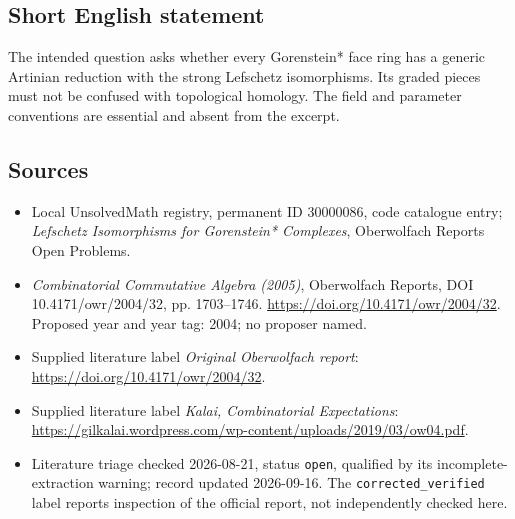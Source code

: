 \documentclass[11pt]{article}
\begin{document}
\subsection{Short English statement}
The intended question asks whether every Gorenstein* face ring has a generic Artinian reduction with the strong Lefschetz isomorphisms. Its graded pieces must not be confused with topological homology. The field and parameter conventions are essential and absent from the excerpt.
\subsection{Sources}
\begin{itemize}\item Local UnsolvedMath registry, permanent ID 30000086, code catalogue entry; \emph{Lefschetz Isomorphisms for Gorenstein* Complexes}, Oberwolfach Reports Open Problems.\item \emph{Combinatorial Commutative Algebra (2005)}, Oberwolfach Reports, DOI 10.4171/owr/2004/32, pp. 1703--1746. \url{https://doi.org/10.4171/owr/2004/32}. Proposed year and year tag: 2004; no proposer named.\item Supplied literature label \emph{Original Oberwolfach report}: \url{https://doi.org/10.4171/owr/2004/32}.\item Supplied literature label \emph{Kalai, Combinatorial Expectations}: \url{https://gilkalai.wordpress.com/wp-content/uploads/2019/03/ow04.pdf}.\item Literature triage checked 2026-08-21, status \texttt{open}, qualified by its incomplete-extraction warning; record updated 2026-09-16. The \texttt{corrected\_verified} label reports inspection of the official report, not independently checked here.\end{itemize}
\end{document}
